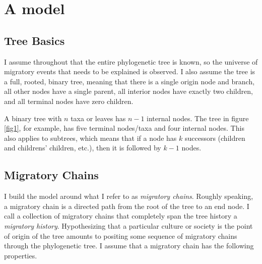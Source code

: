 \documentclass[11pt]{article}
\begin{document}
\section{A model}

\subsection{Tree Basics}

I assume throughout that the entire phylogenetic tree is known, so the universe of migratory events that needs to be explained is observed. I also assume the tree is a full, rooted, binary tree, meaning that there is a single origin node and branch, all other nodes have a single parent, all interior nodes have exactly two children, and all terminal nodes have zero children. 

A binary tree with $n$ taxa or leaves has $n-1$ internal nodes. The tree in figure \ref{fig1}, for example,  has five terminal nodes/taxa  and four internal nodes. This also applies to subtrees, which means that if a node has $k$ successors (children and childrens' children, etc.), then it is followed by $k-1$ nodes.

\subsection{Migratory Chains}
 
I build the model around what I refer to as \textit{migratory chains}. Roughly speaking, a migratory chain is a directed path from the root of the tree to an end node. I call a  collection of migratory chains that completely span the tree history a \textit{migratory history}. Hypothesizing that a particular culture or society is the point of origin of the tree amounts to positing some sequence of migratory chains through the phylogenetic tree. I assume that a migratory chain has the following properties.
\end{document}
